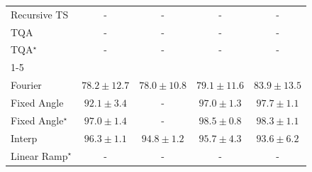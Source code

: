 \begin{tabular}{l|cccc|}
Recursive TS & {\cellcolor[HTML]{000000}} \color[HTML]{F1F1F1} {\cellcolor{white}} \color{black} - & {\cellcolor[HTML]{000000}} \color[HTML]{F1F1F1} {\cellcolor{white}} \color{black} - & {\cellcolor[HTML]{000000}} \color[HTML]{F1F1F1} {\cellcolor{white}} \color{black} - & {\cellcolor[HTML]{000000}} \color[HTML]{F1F1F1} {\cellcolor{white}} \color{black} - \\
TQA & {\cellcolor[HTML]{000000}} \color[HTML]{F1F1F1} {\cellcolor{white}} \color{black} - & {\cellcolor[HTML]{000000}} \color[HTML]{F1F1F1} {\cellcolor{white}} \color{black} - & {\cellcolor[HTML]{000000}} \color[HTML]{F1F1F1} {\cellcolor{white}} \color{black} - & {\cellcolor[HTML]{000000}} \color[HTML]{F1F1F1} {\cellcolor{white}} \color{black} - \\
TQA$^\star$ & {\cellcolor[HTML]{000000}} \color[HTML]{F1F1F1} {\cellcolor{white}} \color{black} - & {\cellcolor[HTML]{000000}} \color[HTML]{F1F1F1} {\cellcolor{white}} \color{black} - & {\cellcolor[HTML]{000000}} \color[HTML]{F1F1F1} {\cellcolor{white}} \color{black} - & {\cellcolor[HTML]{000000}} \color[HTML]{F1F1F1} {\cellcolor{white}} \color{black} - \\
\cline{1-5}
\multicolumn{5}{c}{\rule{0pt}{8pt}SV} \\
\midrule
Fourier & {\cellcolor[HTML]{FEF6FA}} \color[HTML]{000000} $78.2\pm 12.7$ & {\cellcolor[HTML]{FFF7FB}} \color[HTML]{000000} $78.0\pm 10.8$ & {\cellcolor[HTML]{F7F0F7}} \color[HTML]{000000} $79.1\pm 11.6$ & {\cellcolor[HTML]{C4CBE3}} \color[HTML]{000000} $83.9\pm 13.5$ \\
Fixed Angle & {\cellcolor[HTML]{1C7FB8}} \color[HTML]{F1F1F1} $92.1\pm 3.4$ & {\cellcolor[HTML]{000000}} \color[HTML]{F1F1F1} {\cellcolor{white}} \color{black} - & {\cellcolor[HTML]{034B76}} \color[HTML]{F1F1F1} $97.0\pm 1.3$ & {\cellcolor[HTML]{034267}} \color[HTML]{F1F1F1} $97.7\pm 1.1$ \\
Fixed Angle$^\star$ & {\cellcolor[HTML]{034B76}} \color[HTML]{F1F1F1} $97.0\pm 1.4$ & {\cellcolor[HTML]{000000}} \color[HTML]{F1F1F1} {\cellcolor{white}} \color{black} - & {\cellcolor[HTML]{023858}} \color[HTML]{F1F1F1} $98.5\pm 0.8$ & {\cellcolor[HTML]{023A5B}} \color[HTML]{F1F1F1} $98.3\pm 1.1$ \\
Interp & {\cellcolor[HTML]{045585}} \color[HTML]{F1F1F1} $96.3\pm 1.1$ & {\cellcolor[HTML]{04649D}} \color[HTML]{F1F1F1} $94.8\pm 1.2$ & {\cellcolor[HTML]{045B8F}} \color[HTML]{F1F1F1} $95.7\pm 4.3$ & {\cellcolor[HTML]{056EAD}} \color[HTML]{F1F1F1} $93.6\pm 6.2$ \\
Linear Ramp$^\star$ & {\cellcolor[HTML]{000000}} \color[HTML]{F1F1F1} {\cellcolor{white}} \color{black} - & {\cellcolor[HTML]{000000}} \color[HTML]{F1F1F1} {\cellcolor{white}} \color{black} - & {\cellcolor[HTML]{000000}} \color[HTML]{F1F1F1} {\cellcolor{white}} \color{black} - & {\cellcolor[HTML]{000000}} \color[HTML]{F1F1F1} {\cellcolor{white}} \color{black} - \\

\end{tabular}

